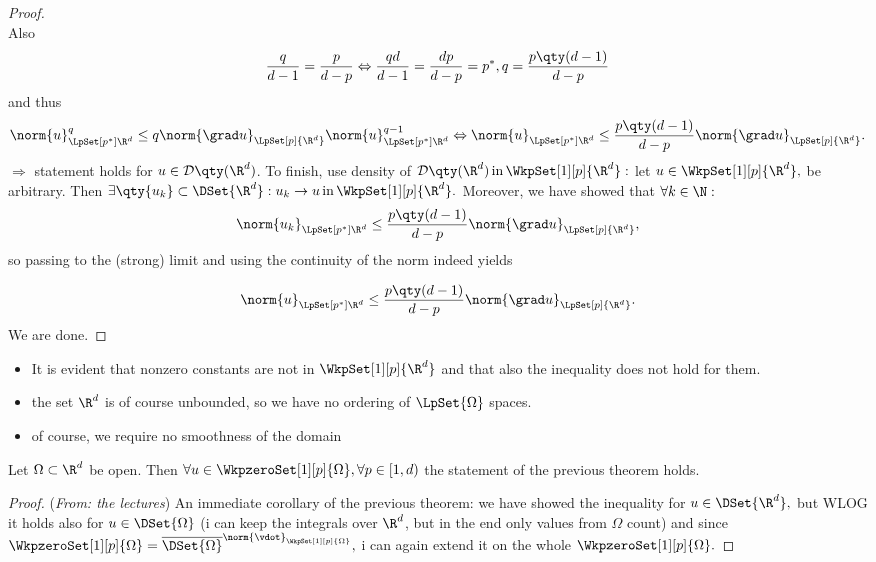 \begin{proof}
\[	\]
	Also
	\[
	\frac{q}{d-1} = \frac{p}{d-p} \Leftrightarrow \frac{qd}{d-1} = \frac{dp}{d-p} = p^{*},	q = \frac{p\qty(d-1)}{d-p}
	\]
	and thus
	\[
		\norm{u}_{\LpSet[p^{*}]{\R^{d}}}^q \leq q \norm{\grad u }_{\LpSet[p]{\R^{d}}} \norm{u}_{\LpSet[p^{*}]{\R^{d}}}^{q-1} \Leftrightarrow \norm{u}_{\LpSet[p^{*}]{\R^{d}}}\leq \frac{p\qty(d-1)}{d-p}\norm{\grad u}_{\LpSet[p]{\R^{d}}}.
	\]
	$\Rightarrow$ statement holds for $u \in \mathcal{D}\qty(\R^d)$. To finish, use density of $\mathcal{D}\qty(\R^d) \, \text{in} \, \WkpSet[1][p]{\R^d}:$ let $u \in \WkpSet[1][p]{\R^{d}},$ be arbitrary. Then $\exists \qty{u_k} \subset \DSet{\R^{d}}: u_k \to u \, \text{in} \,\WkpSet[1][p]{\R^{d}}.$ Moreover, we have showed that $\forall k \in \N:$
	\[
		\norm{u_k}_{\LpSet[p^{*}]{\R^{d}}} \leq \frac{p\qty(d-1)}{d-p}\norm{\grad u}_{\LpSet[p]{\R^{d}}},
	\]
	so passing to the (strong) limit and using the continuity of the norm indeed yields

	\[
		\norm{u}_{\LpSet[p^{*}]{\R^{d}}} \leq \frac{p\qty(d-1)}{d-p}\norm{\grad u}_{\LpSet[p]{\R^{d}}}.
	\]
	We are done.


\end{proof}


\begin{remark}

	\begin{itemize}
		\item It is evident that nonzero constants are not in $\WkpSet[1][p]{\R^d}$ and that also the inequality does not hold for them.
		\item the set $\R^d$ is of course unbounded, so we have no ordering of $\LpSet{\Omega}$ spaces.
		\item of course, we require no smoothness of the domain
	\end{itemize}


\end{remark}

\begin{theorem}
	Let $\Omega \subset \R^d$ be open. Then $\forall u \in \WkpzeroSet[1][p]{\Omega}, \forall p \in [1,d)$ the statement of the previous theorem holds.
\end{theorem}
\begin{proof}(\textit{From: the lectures})
	An immediate corollary of the previous theorem: we have showed the inequality for $u \in \DSet{\R^{d}},$ but WLOG it holds also for $u \in \DSet{\Omega}$ (i can keep the integrals over $\R^{d}$, but in the end only values from $\Omega$ count) and since $\WkpzeroSet[1][p]{\Omega} = \overline{\DSet{\Omega}}^{\norm{\vdot}_{\WkpSet[1][p]{\Omega}}},$ i can again extend it on the whole $\WkpzeroSet[1][p]{\Omega}.$
\end{proof}

